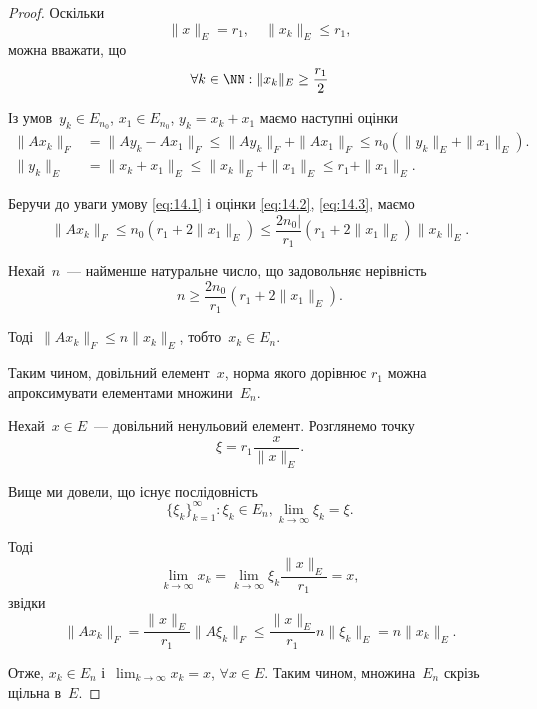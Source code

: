 \begin{proof}
Оскільки
\begin{equation*}
    \|x\|_E = r_1, \quad \|x_k\|_E \le r_1,
\end{equation*}
можна вважати, що
\begin{equation}
    \label{eq:14.1}
    \forall k \in \NN: \|x_k\|_E \ge \frac{r_1}{2}
\end{equation}

Із умов~$y_k \in E_{n_0}$, $x_1 \in E_{n_0}$, $y_k = x_k + x_1$
маємо наступні оцінки
\begin{align}
    \label{eq:14.2}
    \|Ax_k\|_F &= \|A y_k - A x_1\|_F \le \|A y_k\|_F + \|A x_1\|_F \le n_0 (\|y_k\|_E + \|x_1\|_E). \\
    \label{eq:14.3}
    \|y_k\|_E &= \|x_k + x_1\|_E \le \|x_k\|_E + \|x_1\|_E \le r_1 + \|x_1\|_E.
\end{align}

Беручи до уваги умову \eqref{eq:14.1} і оцінки \eqref{eq:14.2}, \eqref{eq:14.3}, маємо
\begin{equation*}
    \|A x_k\|_F \le
    n_0 (r_1 + 2 \|x_1\|_E) \le
    \frac{2 n_0|}{r_1} (r_1 + 2 \|x_1\|_E) \|x_k\|_E.
\end{equation*}

Нехай~$n$~--- найменше натуральне число, що задовольняє нерівність
\begin{equation*}
    n \ge \frac{2 n_0}{r_1} (r_1 + 2 \|x_1\|_E).
\end{equation*}

Тоді~$\|Ax_k\|_F \le n \|x_k\|_E$, тобто~$x_k \in E_n$.

Таким чином, довільний елемент~$x$, норма якого дорівнює
$r_1$ можна апроксимувати елементами множини~$E_n$.

Нехай~$x \in E$~--- довільний ненульовий елемент.
Розглянемо точку 
\begin{equation*}
    \xi = r_1 \frac{x}{\|x\|_E}.
\end{equation*}

Вище ми довели, що існує послідовність
\begin{equation*}
    \{\xi_k\}_{k = 1}^\infty: \xi_k \in E_n, \lim_{k \to \infty} \xi_k = \xi.
\end{equation*}

Тоді
\begin{equation*}
    \lim_{k \to \infty} x_k = \lim_{k \to \infty} \xi_k \frac{\|x\|_E}{r_1} = x,
\end{equation*}
звідки
\begin{equation*}
    \|Ax_k\|_F = \frac{\|x\|_E}{r_1} \|A\xi_k\|_F \le \frac{\|x\|_E}{r_1} n \|\xi_k\|_E = n \|x_k\|_E.
\end{equation*}

Отже, $x_k \in E_n$ і~$\lim_{k \to \infty} x_k = x$, $\forall x \in E$.
Таким чином, множина~$E_n$ скрізь щільна в~$E$.
\end{proof}

